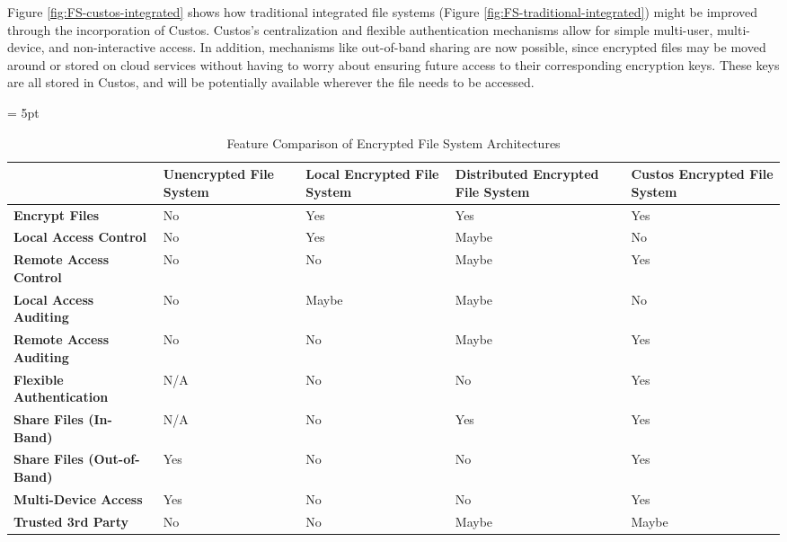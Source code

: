 Figure \ref{fig:FS-custos-integrated} shows how traditional integrated
file systems (Figure \ref{fig:FS-traditional-integrated}) might be
improved through the incorporation of Custos. Custos's centralization
and flexible authentication mechanisms allow for simple multi-user,
multi-device, and non-interactive access. In addition, mechanisms like
out-of-band sharing are now possible, since encrypted files may be
moved around or stored on cloud services without having to worry about
ensuring future access to their corresponding encryption keys. These
keys are all stored in Custos, and will be potentially available
wherever the file needs to be accessed.

\begin{table}[!tb]
  \vspace{5ex}
  \begin{center}
    \tabulinesep = 5pt
    \begin{tabu} to \textwidth
      { | X[1.5,c,m]
        | X[1,c,m]
        | X[1,c,m]
        | X[1,c,m]
        | X[1,c,m]
        | }
      \hline
      & \textbf{Unencrypted File System}
      & \textbf{Local Encrypted File System}
      & \textbf{Distributed Encrypted File System}
      & \textbf{Custos Encrypted File System}
      \\ \hline
      \textbf{Encrypt Files}
      & No & Yes & Yes & Yes
      \\ \hline
      \textbf{Local Access Control}
      & No & Yes & Maybe & No
      \\ \hline
      \textbf{Remote Access Control}
      & No & No & Maybe & Yes
      \\ \hline
      \textbf{Local Access Auditing}
      & No & Maybe & Maybe & No
      \\ \hline
      \textbf{Remote Access Auditing}
      & No & No & Maybe & Yes
      \\ \hline
      \textbf{Flexible Authentication}
      & N/A & No & No & Yes
      \\ \hline
      \textbf{Share Files (In-Band)}
      & N/A & No & Yes & Yes
      \\ \hline
      \textbf{Share Files (Out-of-Band)}
      & Yes & No & No & Yes
      \\ \hline
      \textbf{Multi-Device Access}
      & Yes & No & No & Yes
      \\ \hline
      \textbf{Trusted 3rd Party}
      & No & No & Maybe & Maybe
      \\ \hline
      \end{tabu}
  \end{center}
  \caption{Feature Comparison of Encrypted File System Architectures}
  \label{tab:comp-fs}
\end{table}

